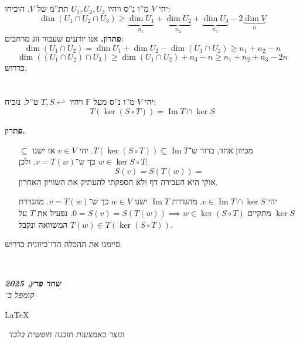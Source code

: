 \documentclass[]{article}
\newcommand\en[1] {\begin{otherlanguage}{english}#1\end{otherlanguage}}
\newcommand\ndoc  {\dotfill \\ \vfil {\begin{center}
			{\textbf{\textit{שחר פרץ, 2025}} \\
				\scriptsize \textit{קומפל ב־}\en{\LaTeX}\,\textit{ ונוצר באמצעות תוכנה חופשית בלבד}}
	\end{center}} \vfil	}
\DeclareMathOperator\Img   {Im}
\newcommand\F         {\mathbb{F}}
\theoremstyle{definition}
\newcommand\lilyarr {\hookleftarrow}
\begin{document}
	\section{}
	יהי $V$ מ''ו נ''ס ויהיו $U_1, U_2, U_3$ תת''מ של $V$. הוכיחו: 
	\[ \dim(U_1 \cap U_2 \cap U_3) \ge \underbrace{\dim U_1}_{n_1} + \underbrace{\dim U_2}_{n_2} + \underbrace{\dim U_3}_{n_3} -2\underbrace{\dim V}_{n} \]
	\textbf{פתרון. }אנו יודעים שעבור זוג מרחבים: 
	\[ \dim(U_1 \cap U_2) = \dim U_1 + \dim U_2 - \dim (U_1 \cap U_2) \ge n_1 + n_2 - n \]
	\[ \dim ((U_1 \cap U_2) \cap U_3) \ge \dim (U_1 \cap U_2) + n_3 - n \ge n_1 + n_2 + n_3 - 2n \]
	כדרוש. 
	
	\section{}
	יהי $V$ מ''ו נ''ס מעל $\F$ ויהיו $T, S \lilyarr$ ט''ל. נוכיח: 
	\[ T(\ker(S \circ T)) = \Img T \cap \ker S \]
	
	\textbf{פתרון. }
	
	\begin{itemize}
		\item[$\subseteq$]מכיוון אחד, ברור ש־$T(\ker(S \circ T)) \subseteq \Img T$. יהי $v \in V$ אז ישנו $w \in \ker S \circ T$ כך ש־$v = T(w)$. 
		ולכן: 
		\[ S(v) = S(T(w)) =  \]
		אוקי היא העבירה דף ולא הספקתי להעתיק את השוויון האחרון. 
		\item[\reflectbox{$\subseteq$}]יהי $v \in \Img T \cap \ker S$. מהגדרת $\Img T$ ישנו $w \in V$ כך ש־$v = T(w)$. מהגדרת $\ker S$ מתקיים $0 = S(v) = S(T(w)) \implies w \in \ker (S \circ T)$. נפעיל את $T$ על המשוואה ונקבל $T(w) \in T(\ker (S \circ T))$. 
	\end{itemize}
	סיימנו את ההכלה הדו־כיוונית כדרוש. 
	
	
	
	
	
	
	
	\ndoc
\end{document}
